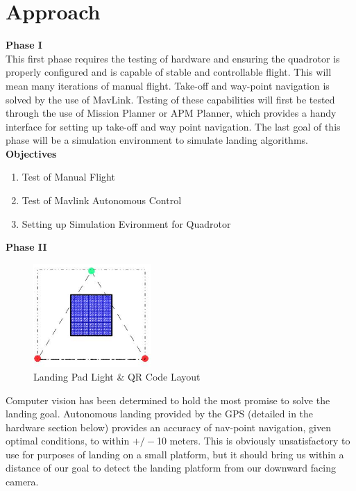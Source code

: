 \documentclass[11pt]{article}
\begin{document}
\section*{Approach}

\textbf{Phase I}\\
This first phase requires the testing of hardware and ensuring the quadrotor is properly configured and is capable of stable and controllable flight. This will mean many iterations of manual flight. Take-off and way-point navigation is solved by the use of MavLink. Testing of these capabilities will first be tested through the use of Mission Planner or APM Planner, which provides a handy interface for setting up take-off and way point navigation. The last goal of this phase will be a simulation environment to simulate landing algorithms.\\

\noindent \textbf{Objectives}
\begin{enumerate}
	\item Test of Manual Flight
	\item Test of Mavlink Autonomous Control
	\item Setting up Simulation Evironment for Quadrotor
\end{enumerate}

\noindent \textbf{Phase II}

\begin{figure}
\includegraphics[width=0.4\textwidth]{landing_pad}
\caption{Landing Pad Light \& QR Code Layout}
\label{fig:landing_pad}
\end{figure}

\noindent Computer vision has been determined to hold the most promise to solve the landing goal. Autonomous landing provided by the GPS (detailed in the hardware section below) provides an accuracy of nav-point navigation, given optimal conditions, to within $+/-$10 meters. This is obviously unsatisfactory to use for purposes of landing on a small platform, but it should bring us within a distance of our goal to detect the landing platform from our downward facing camera. \\
\end{document}
